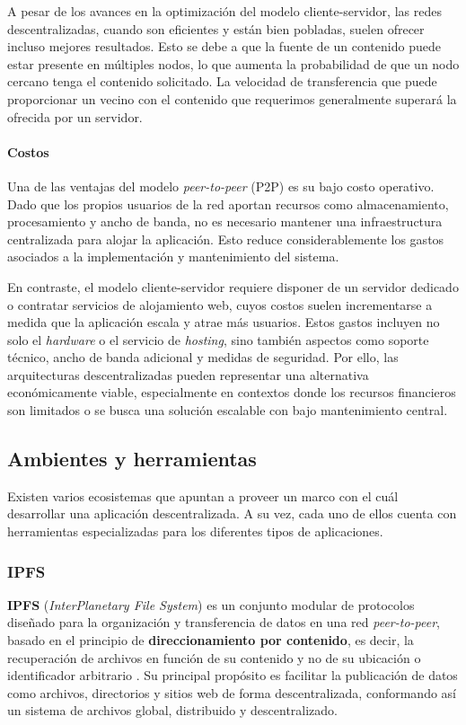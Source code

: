 A pesar de los avances en la optimización del modelo cliente-servidor, las redes descentralizadas, cuando son eficientes y están bien pobladas, suelen ofrecer incluso mejores resultados. Esto se debe a que la fuente de un contenido puede estar presente en múltiples nodos, lo que aumenta la probabilidad de que un nodo cercano tenga el contenido solicitado. La velocidad de transferencia que puede proporcionar un vecino con el contenido que requerimos generalmente superará la ofrecida por un servidor.

\paragraph{Costos}
Una de las ventajas del modelo \textit{peer-to-peer} (P2P) es su bajo costo operativo. Dado que los propios usuarios de la red aportan recursos como almacenamiento, procesamiento y ancho de banda, no es necesario mantener una infraestructura centralizada para alojar la aplicación. Esto reduce considerablemente los gastos asociados a la implementación y mantenimiento del sistema.

En contraste, el modelo cliente-servidor requiere disponer de un servidor dedicado o contratar servicios de alojamiento web, cuyos costos suelen incrementarse a medida que la aplicación escala y atrae más usuarios. Estos gastos incluyen no solo el \textit{hardware} o el servicio de \textit{hosting}, sino también aspectos como soporte técnico, ancho de banda adicional y medidas de seguridad. Por ello, las arquitecturas descentralizadas pueden representar una alternativa económicamente viable, especialmente en contextos donde los recursos financieros son limitados o se busca una solución escalable con bajo mantenimiento central.

\subsection{Ambientes y herramientas}
Existen varios ecosistemas que apuntan a proveer un marco con el cuál desarrollar una aplicación descentralizada. A su vez, cada uno de ellos cuenta con herramientas especializadas para los diferentes tipos de aplicaciones.

\subsubsection{IPFS}

\textbf{IPFS} (\textit{InterPlanetary File System}) es un conjunto modular de protocolos diseñado para la organización y transferencia de datos en una red \textit{peer-to-peer}, basado en el principio de \textbf{direccionamiento por contenido}, es decir, la recuperación de archivos en función de su contenido y no de su ubicación o identificador arbitrario \cite{ipfs}. Su principal propósito es facilitar la publicación de datos como archivos, directorios y sitios web de forma descentralizada, conformando así un sistema de archivos global, distribuido y descentralizado.

